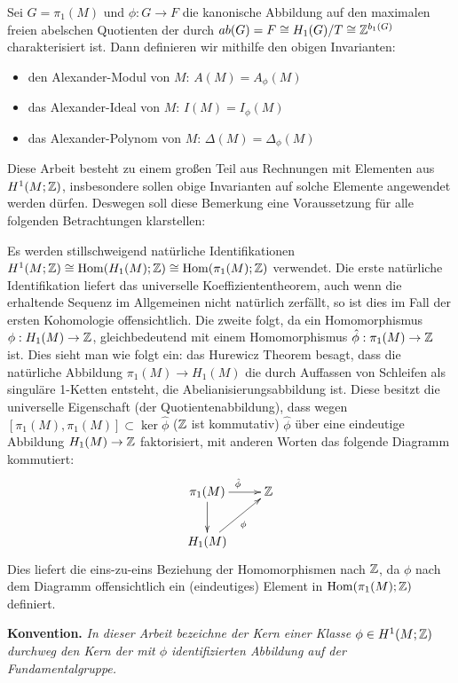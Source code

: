         \begin{defn}
            Sei $G=\pi_1(M)$ und $\phi:G \to F$ die kanonische Abbildung auf den maximalen freien abelschen Quotienten der durch $ab(G) = F \cong H_1(G)/T \cong \mathbb{Z}^{b_1(G)}$ charakterisiert ist. Dann definieren wir mithilfe den obigen Invarianten:
            \begin{itemize}
                \item den Alexander-Modul von $M$: $A(M)=A_\phi(M)$
                \item das Alexander-Ideal von $M$: $I(M)=I_\phi(M)$
                \item das Alexander-Polynom von $M$: $\Delta(M)=\Delta_\phi(M)$ 
            \end{itemize}
        \end{defn}
        \begin{bem}
            \label{bem:fundhomologie}
            Diese Arbeit besteht zu einem großen Teil aus Rechnungen mit Elementen aus $H^1(M;\mathbb{Z})$, insbesondere sollen obige Invarianten auf solche Elemente angewendet werden dürfen. Deswegen soll diese Bemerkung eine Voraussetzung für alle folgenden Betrachtungen klarstellen:

            Es werden stillschweigend natürliche Identifikationen $H^1(M;\mathbb{Z}) \cong \operatorname{Hom}(H_1(M);\mathbb{Z}) \cong \operatorname{Hom}(\pi_1(M);\mathbb{Z})$ verwendet. Die erste natürliche Identifikation liefert das universelle Koeffiziententheorem, auch wenn die erhaltende Sequenz im Allgemeinen nicht natürlich zerfällt, so ist dies im Fall der ersten Kohomologie offensichtlich. Die zweite folgt, da ein Homomorphismus $\phi: H_1(M) \to \mathbb{Z}$, gleichbedeutend mit einem Homomorphismus $\hat\phi : \pi_1(M) \to \mathbb{Z}$ ist. Dies sieht man wie folgt ein: das Hurewicz Theorem besagt, dass die natürliche Abbildung $\pi_1(M) \to H_1(M)$ die durch Auffassen von Schleifen als singuläre 1-Ketten entsteht, die Abelianisierungsabbildung ist. Diese besitzt die universelle Eigenschaft (der Quotientenabbildung), dass wegen $[\pi_1(M),\pi_1(M)] \subset \ker \hat \phi$ ($\mathbb{Z}$ ist kommutativ) $\hat \phi$ über eine eindeutige Abbildung $H_1(M) \to \mathbb{Z}$ faktorisiert, mit anderen Worten das folgende Diagramm kommutiert:
            \[
                \begin{xy}
                    \xymatrix{\pi_1(M)\ar[r]^{\hat \phi} \ar[d] & \ZZ \\
                                H_1(M)\ar[ru]_\phi}
                \end{xy}
            \]
            Dies liefert die eins-zu-eins Beziehung der Homomorphismen nach $\mathbb{Z}$, da $\phi$ nach dem Diagramm offensichtlich ein (eindeutiges) Element in $\operatorname{Hom}(\pi_1(M);\mathbb{Z})$ definiert. \\ \par
            \noindent\textbf{Konvention.} \emph{In dieser Arbeit bezeichne der Kern einer Klasse $\phi \in H^1(M;\mathbb{Z})$ durchweg den Kern der mit $\phi$ identifizierten Abbildung auf der Fundamentalgruppe.}\\ \par
        \end{bem}

